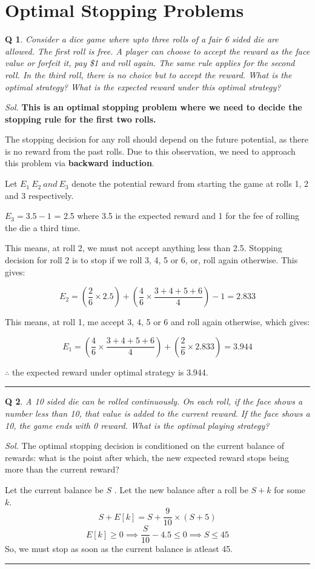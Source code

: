 \documentclass[DIV=15, fleqn, oneside, 8pt]{scrartcl}
\theoremstyle{clean}
\newtheorem{question}{Q} %
\newenvironment{solution}
{\par\textit{Sol.} }     %
{\par\medskip\hrule\bigskip}
\begin{document}
\section*{Optimal Stopping Problems}
\begin{question}
Consider a dice game where upto three rolls of a fair 6 sided die are allowed. The first roll
is free. A player can choose to accept the reward as the face value or forfeit it, pay \$1 and roll
again. The same rule applies for the second roll. In the third roll, there is no choice but to
accept the reward. What is the optimal strategy? What is the expected reward under this optimal
strategy?
\end{question}
\begin{solution}
\textbf{This is an optimal stopping problem where we need to decide the stopping rule for the 
first two rolls.}


The stopping decision for any roll should depend on the future potential, as there is no reward
from the past rolls. Due to this observation, we need to approach this problem via
\textbf{backward induction}.

Let $E_1 \: E_2 \: and\: E_3$ denote the potential reward from starting the game at rolls 1, 2 and
3 respectively.

$E_3 = 3.5 - 1$ = 2.5 where 3.5 is the expected reward and 1 for the fee of rolling the die a 
third time.

This means, at roll 2, we must not accept anything less than 2.5. Stopping decision for roll 2 is
to stop if we roll 3, 4, 5 or 6, or, roll again otherwise. This gives:

\[
E_2 = (\frac{2}{6} \times 2.5) + (\frac{4}{6} \times \frac{3 + 4 + 5 + 6}{4}) - 1 = 2.833 
\]

This means, at roll 1, me accept  3, 4, 5 or 6 and roll again otherwise, which gives:

\[
E_1 = (\frac{4}{6} \times \frac{3 + 4 + 5 + 6}{4}) + (\frac{2}{6} \times 2.833) = 3.944
\]

$\therefore$ the expected reward under optimal strategy is 3.944.
\end{solution}

\begin{question}
A 10 sided die can be rolled continuously. On each roll, if the face shows a number less than 10,
that value is added to the current reward. If the face shows a 10, the game ends with 0 reward.
What is the optimal playing strategy?
\end{question}
\begin{solution}
The optimal stopping decision is conditioned on the current balance of rewards: what is the point
after which, the new expected reward stops being more than the current reward?

Let the current balance be $S$ . Let the new balance after a roll be $S + k$ for some $k$.
\[S + E[k] = S + \frac{9}{10} \times (S + 5)\]
\[E[k] \geq 0 \implies \frac{S}{10} - 4.5 \leq 0 \implies S \leq 45 \]
So, we must stop as soon as the current balance is atleast 45.

\end{solution}
\end{document}
